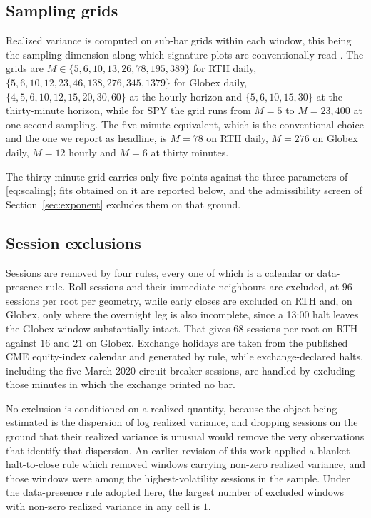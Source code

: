 \subsection{Sampling grids}

Realized variance is computed on sub-bar grids within each window, this being the
sampling dimension along which signature plots are conventionally
read \citep{abdl2000}. The grids are
$M \in \{5,6,10,13,26,78,195,389\}$ for RTH daily, %
$\{5,6,10,12,23,46,138,276,345,1379\}$ for Globex daily, %
$\{4,5,6,10,12,15,20,30,60\}$ at the hourly horizon and
$\{5,6,10,15,30\}$ at the thirty-minute horizon, while for SPY the grid runs from
$M=5$ to $M=23{,}400$ at one-second sampling. The five-minute equivalent, which
is the conventional choice and the one we report as headline, is $M=78$ on RTH
daily, $M=276$ on Globex daily, $M=12$ hourly and $M=6$ at thirty minutes.

The thirty-minute grid carries only five points against the three parameters of
\eqref{eq:scaling}; fits obtained on it are reported below, and the admissibility
screen of Section~\ref{sec:exponent} excludes them on that ground.

\subsection{Session exclusions}

Sessions are removed by four rules, every one of which is a calendar or
data-presence rule. Roll sessions and their immediate neighbours are excluded, at
$96$ sessions per root per geometry, while early closes are excluded on RTH and, %
on Globex, only where the overnight leg is also incomplete, since a 13:00 halt
leaves the Globex window substantially intact. That gives $68$ sessions per root %
on RTH against $16$ and $21$ on Globex. Exchange holidays are taken from the %
published CME equity-index calendar and generated by rule, while
exchange-declared halts, including the five March 2020 circuit-breaker sessions,
are handled by excluding those minutes in which the exchange printed no bar.

No exclusion is conditioned on a realized quantity, because the object being
estimated is the dispersion of log realized variance, and dropping sessions on
the ground that their realized variance is unusual would remove the very
observations that identify that dispersion. An earlier revision of this work
applied a blanket halt-to-close rule which removed windows carrying non-zero
realized variance, and those windows were among the highest-volatility sessions
in the sample. Under the data-presence rule adopted here, the largest number of
excluded windows with non-zero realized variance in any cell is $1$. %
